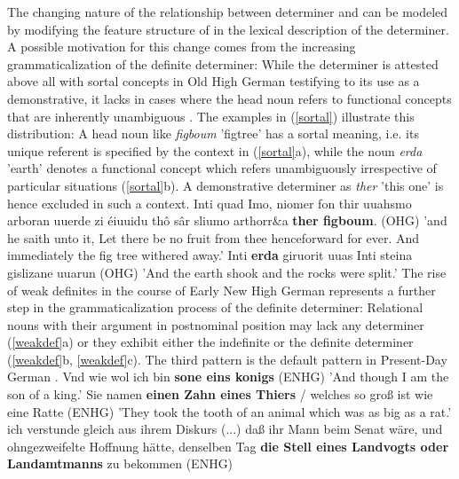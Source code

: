 \documentclass[output=paper]{langsci/langscibook}
\begin{document}
\ea \label{decl-pdg}
\z 

The changing nature of the relationship between determiner and \nom can be modeled by modifying the feature structure of \spr in the lexical description of the determiner. A possible motivation for this change comes from the increasing grammaticalization of the definite determiner: While the determiner is attested above all with sortal concepts in Old High German testifying to its use as a demonstrative, it lacks in cases where the head noun refers to functional concepts that are inherently unambiguous \citep{demske2001}. The examples in (\ref{sortal}) illustrate this distribution: A head noun like \textit{figboum} 'figtree' has a sortal meaning, i.e. its unique referent is specified by the context in (\ref{sortal}a), while the noun \textit{erda} 'earth' denotes a functional concept which refers unambiguously irrespective of particular situations (\ref{sortal}b). A demonstrative determiner as \textit{ther} 'this one' is hence excluded in such a context.
\eal \label{sortal}
\ex Inti quad Imo, niomer fon thir uuahsmo arboran uuerde zi éiuuidu thô sâr sliumo arthorr\&{a} \textbf{ther figboum}. \hfill (OHG)
\glt 'and he saith unto it, Let there be no fruit from thee henceforward for ever. And immediately the fig tree withered away.'
\ex Inti \textbf{erda} giruorit uuas Inti steina gislizane uuarun \hfill (OHG)
\glt 'And the earth shook and the rocks were split.'  
\zl
The rise of weak definites in the course of Early New High German represents a further step in the grammaticalization process of the definite determiner: Relational nouns with their argument in postnominal position may lack any determiner (\ref{weakdef}a) or they exhibit either the indefinite or the definite determiner (\ref{weakdef}b, \ref{weakdef}c). The third pattern is the default pattern in Present-Day German \citep{demske2019}.
\eal \label{weakdef}
\ex Vnd wie wol ich bin \textbf{sone eins konigs} \hfill (ENHG)
\glt 'And though I am the son of a king.'
\ex Sie namen \textbf{einen Zahn eines Thiers} / welches so groß ist wie eine Ratte  \hfill (ENHG)
\glt 'They took the tooth of an animal which was as big as a rat.'
\ex ich verstunde gleich aus ihrem Diskurs (...) daß ihr Mann beim Senat wäre, und ohngezweifelte Hoffnung hätte, denselben Tag \textbf{die Stell eines Landvogts oder Landamtmanns} zu bekommen \hfill (ENHG)
\end{document}
